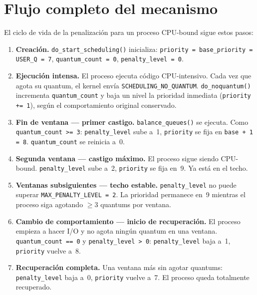 \documentclass[11pt,a4paper]{article}
\begin{document}
\section{Flujo completo del mecanismo}

El ciclo de vida de la penalizaci\'on para un proceso CPU-bound sigue estos pasos:

\begin{enumerate}[leftmargin=*]
  \item \textbf{Creaci\'on.} \texttt{do\_start\_scheduling()} inicializa:
        \texttt{priority = base\_priority = USER\_Q = 7},
        \texttt{quantum\_count = 0}, \texttt{penalty\_level = 0}.

  \item \textbf{Ejecuci\'on intensa.} El proceso ejecuta c\'odigo CPU-intensivo. Cada
        vez que agota su quantum, el kernel env\'ia \texttt{SCHEDULING\_NO\_QUANTUM}.
        \texttt{do\_noquantum()} incrementa \texttt{quantum\_count} y baja un nivel la
        prioridad inmediata (\texttt{priority += 1}), seg\'un el comportamiento
        original conservado.

  \item \textbf{Fin de ventana --- primer castigo.} \texttt{balance\_queues()} se
        ejecuta. Como \texttt{quantum\_count >= 3}: \texttt{penalty\_level} sube a~1,
        \texttt{priority} se fija en \texttt{base + 1 = 8}. \texttt{quantum\_count}
        se reinicia a~0.

  \item \textbf{Segunda ventana --- castigo m\'aximo.} El proceso sigue siendo
        CPU-bound. \texttt{penalty\_level} sube a~2, \texttt{priority} se fija en~9.
        Ya est\'a en el techo.

  \item \textbf{Ventanas subsiguientes --- techo estable.} \texttt{penalty\_level} no
        puede superar \texttt{MAX\_PENALTY\_LEVEL = 2}. La prioridad permanece en~9
        mientras el proceso siga agotando $\geq 3$ quantums por ventana.

  \item \textbf{Cambio de comportamiento --- inicio de recuperaci\'on.} El proceso
        empieza a hacer I/O y no agota ning\'un quantum en una ventana.
        \texttt{quantum\_count == 0} y \texttt{penalty\_level > 0}: \texttt{penalty\_level}
        baja a~1, \texttt{priority} vuelve a~8.

  \item \textbf{Recuperaci\'on completa.} Una ventana m\'as sin agotar quantums:
        \texttt{penalty\_level} baja a~0, \texttt{priority} vuelve a~7. El proceso
        queda totalmente recuperado.
\end{enumerate}
\end{document}
